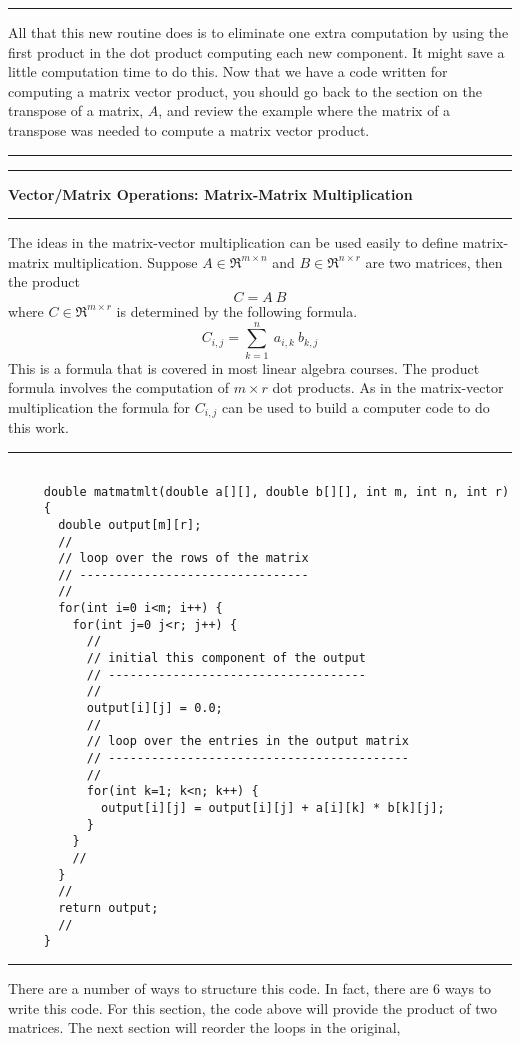 \documentclass[10pt,fleqn]{article}
\begin{document}
\vskip0.1in\hrule\vskip0.1in
\noindent
All that this new routine does is to eliminate one extra computation by using
the first product in the dot product computing each new component. It might save
a little computation time to do this. Now that we have a code written for
computing a matrix vector product, you should go back to the section on the
transpose of a matrix, $A$, and review the example where the matrix of a
transpose was needed to compute a matrix vector product.
\vskip0.1in\hrule\vskip0.1in
\newpage
\vskip0.1in\hrule\vskip0.1in
\noindent
{\bf Vector/Matrix Operations: Matrix-Matrix Multiplication}
\vskip0.1in\hrule\vskip0.1in
\noindent
The ideas in the matrix-vector multiplication can be used easily to define
matrix-matrix multiplication. Suppose $A\in\Re^{m\times n}$ and
$B\in\Re^{n\times r}$ are two matrices, then the product
$$
  C = A\ B
$$
where $C\in\Re^{m\times r}$ is determined by the following formula.
$$
   C_{i,j} = \sum_{k=1}^n\ a_{i,k}\ b_{k,j}
$$
This is a formula that is covered in most linear algebra courses. The product
formula involves the computation of $m\times r$ dot products. As in the
matrix-vector multiplication the formula for $C_{i,j}$ can be used to build a
computer code to do this work.
\vskip0.1in\hrule\vskip0.1in
\begin{verbatim}

     double matmatmlt(double a[][], double b[][], int m, int n, int r)
     {
       double output[m][r];
       //
       // loop over the rows of the matrix
       // --------------------------------
       //
       for(int i=0 i<m; i++) {
         for(int j=0 j<r; j++) {
           //
           // initial this component of the output
           // ------------------------------------
           //
           output[i][j] = 0.0;
           //
           // loop over the entries in the output matrix
           // ------------------------------------------
           //
           for(int k=1; k<n; k++) {
             output[i][j] = output[i][j] + a[i][k] * b[k][j];
           }
         }
         //
       }
       //
       return output;
       //
     }

\end{verbatim}
\vskip0.1in\hrule\vskip0.1in
\noindent
There are a number of ways to structure this code. In fact, there are 6 ways to
write this code. For this section, the code above will provide the product of
two matrices. The next section will reorder the loops in the original,
\end{document}
